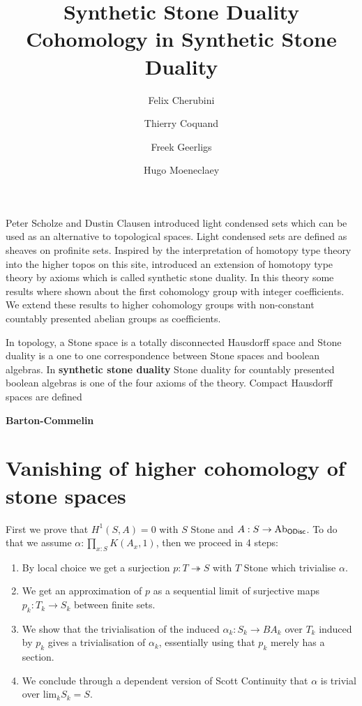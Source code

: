 \documentclass{../util/zariski}
\title{Synthetic Stone Duality 
}
\author{
Felix Cherubini %
\and 
 Thierry Coquand%
\and 
 Freek Geerligs%
\and
 Hugo Moeneclaey %
}
\title{Cohomology in Synthetic Stone Duality}
\begin{document}
\maketitle
Peter Scholze and Dustin Clausen \cite{Scholze} introduced light condensed sets which can be used as an alternative to topological spaces. Light condensed sets are defined as sheaves on profinite sets.
Inspired by the interpretation of homotopy type theory into the higher topos on this site, \cite{synthetic-stone-duality} introduced an extension of homotopy type theory by axioms which is called synthetic stone duality. In this theory some results where shown about the first cohomology group with integer coefficients. We extend these results to higher cohomology groups with non-constant countably presented abelian groups as coefficients.

In topology, a Stone space is a totally disconnected Hausdorff space and Stone duality is a one to one correspondence between Stone spaces and boolean algebras. In \textbf{synthetic stone duality} Stone duality for countably presented boolean algebras is one of the four axioms of the theory. Compact Hausdorff spaces are defined 

\textbf{Barton-Commelin}

\section{Vanishing of higher cohomology of stone spaces}

First we prove that $H^1(S,A) = 0$ with $S$ Stone and  $A : S\to \mathrm{Ab}_{\mathsf{ODisc}}$. To do that we assume $\alpha:\prod_{x:S}K(A_x,1)$, then we proceed in 4 steps:
\begin{enumerate}[(1)]
\item By local choice we get a surjection $p:T\twoheadrightarrow S$ with $T$ Stone which trivialise $\alpha$.
\item We get an approximation of $p$ as a sequential limit of surjective maps $p_k:T_k\to S_k$ between finite sets.
\item We show that the trivialisation of the induced $\alpha_k:S_k\to BA_k$ over $T_k$ induced by $p_k$ gives a trivialisation of $\alpha_k$, essentially using that $p_k$ merely has a section.
\item We conclude through a dependent version of Scott Continuity that $\alpha$ is trivial over $\mathrm{lim}_kS_k =S$.
\end{enumerate}
\end{document}
